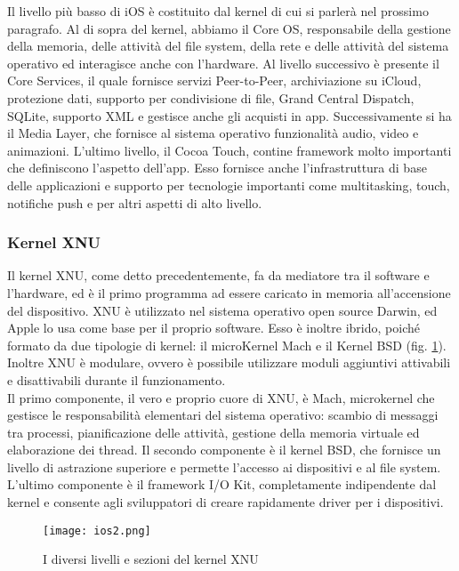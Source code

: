 Il livello più basso di iOS è costituito dal kernel di cui si parlerà nel
prossimo paragrafo. Al di sopra del kernel, abbiamo il Core OS,
responsabile della gestione della memoria, delle attività del file system, della
rete e delle attività del sistema operativo ed interagisce anche con l’hardware.
Al livello successivo è presente il Core Services, il quale fornisce servizi Peer-to-Peer,
archiviazione su iCloud, protezione dati, supporto per condivisione di file, Grand
Central Dispatch, SQLite, supporto XML e gestisce anche gli acquisti in app. Successivamente
si ha il Media Layer, che fornisce al sistema operativo funzionalità audio, video
e animazioni. L’ultimo livello, il Cocoa Touch, contine framework molto importanti
che definiscono l’aspetto dell’app. Esso fornisce anche l'infrastruttura di base delle
applicazioni e supporto per tecnologie importanti come multitasking, touch,
notifiche push e per altri aspetti di alto livello.

\subsubsection{Kernel XNU}
Il kernel XNU, come detto precedentemente, fa da mediatore tra il software
e l’hardware, ed è il primo programma ad essere caricato in memoria
all’accensione del dispositivo. XNU è utilizzato nel sistema operativo open source
Darwin, ed Apple lo usa come base per il proprio software. Esso è inoltre
ibrido, poiché formato da due tipologie di kernel: il microKernel Mach e il
Kernel BSD (fig. \ref{ios2}).
Inoltre XNU è modulare, ovvero è possibile utilizzare moduli aggiuntivi
attivabili e disattivabili durante il funzionamento. \\
Il primo componente, il vero e proprio cuore di XNU, è Mach, microkernel che gestisce le
responsabilità elementari del sistema operativo: scambio di messaggi tra
processi, pianificazione delle attività, gestione della memoria virtuale ed
elaborazione dei thread. Il secondo componente è il kernel BSD, che fornisce un
livello di astrazione superiore e permette l’accesso ai dispositivi e al file
system. L’ultimo componente è il framework I/O Kit, completamente indipendente
dal kernel e consente agli sviluppatori di creare rapidamente driver per i
dispositivi. \\
\begin{figure}[!h]
    \centering
    \texttt{[image: ios2.png]}
    \caption{I diversi livelli e sezioni del kernel XNU}
    \label{ios2}
\end{figure}


